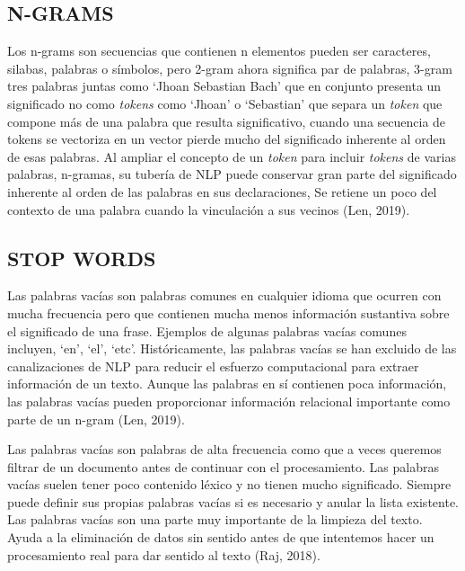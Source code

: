 \documentclass[letter, openright, 12pt]{book}
\begin{document}
\subsection{N-GRAMS}
Los n-grams son secuencias que contienen n elementos pueden ser caracteres, silabas, palabras o símbolos, pero 2-gram ahora significa par de palabras, 3-gram tres palabras juntas como ‘Jhoan Sebastian Bach’ que en conjunto presenta un significado no como \textit{tokens} como ‘Jhoan’ o ‘Sebastian’ que separa un \textit{token} que compone más de una palabra que resulta significativo, cuando una secuencia de tokens se vectoriza en un vector pierde mucho del significado inherente al orden de esas palabras. Al ampliar el concepto de un \textit{token} para incluir \textit{tokens} de varias palabras, n-gramas, su tubería de NLP puede conservar gran parte del significado inherente al orden de las palabras en sus declaraciones, Se retiene un poco del contexto de una palabra cuando la vinculación a sus vecinos (Len, 2019).

\subsection{STOP WORDS}
Las palabras vacías son palabras comunes en cualquier idioma que ocurren con mucha frecuencia pero que contienen mucha menos información sustantiva sobre el significado de una frase. Ejemplos de algunas palabras vacías comunes incluyen, ‘en’, ‘el’, ‘etc’. Históricamente, las palabras vacías se han excluido de las canalizaciones de NLP para reducir el esfuerzo computacional para extraer información de un texto. Aunque las palabras en sí contienen poca información, las palabras vacías pueden proporcionar información relacional importante como parte de un n-gram (Len, 2019).
\par
Las palabras vacías son palabras de alta frecuencia como que a veces queremos filtrar de un documento antes de continuar con el procesamiento. Las palabras vacías suelen tener poco contenido léxico y no tienen mucho significado. Siempre puede definir sus propias palabras vacías si es necesario y anular la lista existente. Las palabras vacías son una parte muy importante de la limpieza del texto. Ayuda a la eliminación de datos sin sentido antes de que intentemos hacer un procesamiento real para dar sentido al texto (Raj, 2018).
\end{document}
